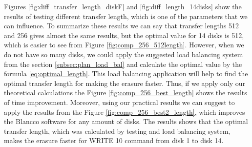 Figures \ref{fig:diff_transfer_length_diskF} and \ref{fig:diff_length_14disks} show the results of testing different transfer length, which is one of the parameters that we can influence. To summarize these results we can say that transfer lengths 512 and 256 gives almost the same results, but the optimal value for 14 disks is 512, which is easier to see from Figure \ref{fig:comp_256_512length}. However, when we do not have so many disks, we could apply the suggested load balancing system from the section \ref{subsec:plan_load_bal} and calculate the optimal value by the formula \ref{eq:optimal_length}. This load balancing application will help to find the optimal transfer length for making the erasure faster. Thus, if we apply only our theoretical calculations the Figure \ref{fig:comp_256_best_length} shows the results of time improvement. Moreover, using our practical results we can suggest to apply the results from the Figure \ref{fig:comp_256_best2_length}, which improves the Blancco software for any amount of disks. The results shows that the optimal transfer length, which was calculated by testing and load balancing system, makes the erasure faster for WRITE 10 command from disk 1 to disk 14.